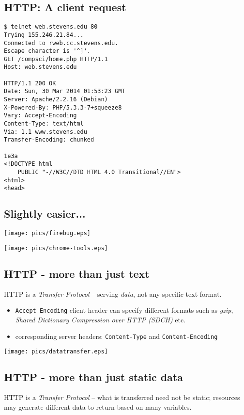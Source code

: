 \documentclass[xga]{xdvislides}
\begin{document}
\subsection{HTTP: A client request}
\smallish
\begin{verbatim}
$ telnet web.stevens.edu 80
Trying 155.246.21.84...
Connected to rweb.cc.stevens.edu.
Escape character is '^]'.
GET /compsci/home.php HTTP/1.1
Host: web.stevens.edu

HTTP/1.1 200 OK
Date: Sun, 30 Mar 2014 01:53:23 GMT
Server: Apache/2.2.16 (Debian)
X-Powered-By: PHP/5.3.3-7+squeeze8
Vary: Accept-Encoding
Content-Type: text/html
Via: 1.1 www.stevens.edu
Transfer-Encoding: chunked

1e3a
<!DOCTYPE html
	PUBLIC "-//W3C//DTD HTML 4.0 Transitional//EN">
<html>
<head>

\end{verbatim}

\subsection{Slightly easier...}
\begin{center}
	\texttt{[image: pics/firebug.eps]}
\end{center}
\addvspace{.25in}
\begin{center}
	\texttt{[image: pics/chrome-tools.eps]}
\end{center}




\subsection{HTTP - more than just text}
HTTP is a {\em Transfer Protocol} -- serving {\em data}, not any specific
text format.

\begin{itemize}
	\item {\tt Accept-Encoding} client header can specify different formats
		such as {\em gzip}, {\em Shared Dictionary Compression over HTTP (SDCH)} etc.
	\item corresponding server headers: {\tt Content-Type} and
		{\tt Content-Encoding}
\end{itemize}
\begin{center}
	\texttt{[image: pics/datatransfer.eps]}
\end{center}

\subsection{HTTP - more than just static data}
HTTP is a {\em Transfer Protocol} -- what is transferred need not be
static; resources may generate different data to return based on many
variables.
\end{document}
